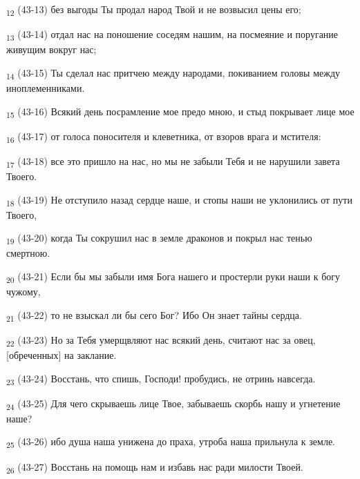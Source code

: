 \begin{tcolorbox}
\textsubscript{12} (43-13) без выгоды Ты продал народ Твой и не возвысил цены его;
\end{tcolorbox}
\begin{tcolorbox}
\textsubscript{13} (43-14) отдал нас на поношение соседям нашим, на посмеяние и поругание живущим вокруг нас;
\end{tcolorbox}
\begin{tcolorbox}
\textsubscript{14} (43-15) Ты сделал нас притчею между народами, покиванием головы между иноплеменниками.
\end{tcolorbox}
\begin{tcolorbox}
\textsubscript{15} (43-16) Всякий день посрамление мое предо мною, и стыд покрывает лице мое
\end{tcolorbox}
\begin{tcolorbox}
\textsubscript{16} (43-17) от голоса поносителя и клеветника, от взоров врага и мстителя:
\end{tcolorbox}
\begin{tcolorbox}
\textsubscript{17} (43-18) все это пришло на нас, но мы не забыли Тебя и не нарушили завета Твоего.
\end{tcolorbox}
\begin{tcolorbox}
\textsubscript{18} (43-19) Не отступило назад сердце наше, и стопы наши не уклонились от пути Твоего,
\end{tcolorbox}
\begin{tcolorbox}
\textsubscript{19} (43-20) когда Ты сокрушил нас в земле драконов и покрыл нас тенью смертною.
\end{tcolorbox}
\begin{tcolorbox}
\textsubscript{20} (43-21) Если бы мы забыли имя Бога нашего и простерли руки наши к богу чужому,
\end{tcolorbox}
\begin{tcolorbox}
\textsubscript{21} (43-22) то не взыскал ли бы сего Бог? Ибо Он знает тайны сердца.
\end{tcolorbox}
\begin{tcolorbox}
\textsubscript{22} (43-23) Но за Тебя умерщвляют нас всякий день, считают нас за овец, [обреченных] на заклание.
\end{tcolorbox}
\begin{tcolorbox}
\textsubscript{23} (43-24) Восстань, что спишь, Господи! пробудись, не отринь навсегда.
\end{tcolorbox}
\begin{tcolorbox}
\textsubscript{24} (43-25) Для чего скрываешь лице Твое, забываешь скорбь нашу и угнетение наше?
\end{tcolorbox}
\begin{tcolorbox}
\textsubscript{25} (43-26) ибо душа наша унижена до праха, утроба наша прильнула к земле.
\end{tcolorbox}
\begin{tcolorbox}
\textsubscript{26} (43-27) Восстань на помощь нам и избавь нас ради милости Твоей.
\end{tcolorbox}
